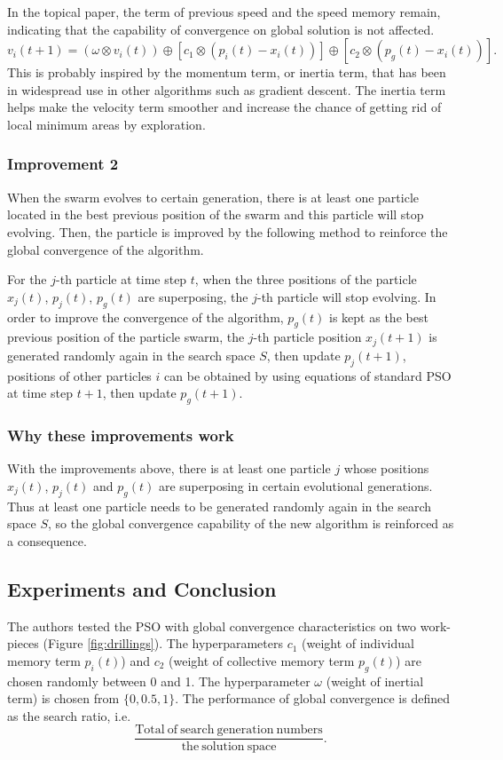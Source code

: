 \documentclass{IEEEtran}
\begin{document}
{{{            In the topical paper, the term of previous speed and the speed memory remain, indicating that the capability of convergence on global solution is not affected.
            $$v_i(t+1) = (\omega \otimes v_i(t)) \oplus [c_1 \otimes (p_i(t) - x_i(t))] \oplus [c_2 \otimes (p_g(t) - x_i(t))].$$
            This is probably inspired by the momentum term, or inertia term, that has been in widespread use in other algorithms such as gradient descent.
            The inertia term helps make the velocity term smoother and increase the chance of getting rid of local minimum areas by exploration.
        }

        \subsubsection{Improvement 2}
        {
            When the swarm evolves to certain generation, 
            there is at least one particle located in the best previous position of the swarm and this particle will stop evolving. 
            Then, the particle is improved by the following method to reinforce the global convergence of the algorithm.

            For the $j$-th particle at time step $t$, when the three positions of the particle $x_j(t)$, $p_j(t)$, $p_g(t)$ are superposing, the $j$-th particle will stop evolving. 
            In order to improve the convergence of the algorithm, $p_g(t)$ is kept as the best previous position of the particle swarm, 
            the $j$-th particle position $x_j(t+1)$ is generated randomly again in the search space $S$, then update $p_j(t+1)$, 
            positions of other particles $i$ can be obtained by using equations of standard PSO at time step $t+1$, then update $p_g(t+1)$.
        }

        \subsubsection{Why these improvements work}
        {
            With the improvements above, there is at least one particle $j$ whose positions $x_j(t)$, $p_j(t)$ and $p_g(t)$ are superposing in certain evolutional generations. 
            Thus at least one particle needs to be generated randomly again in the search space $S$, so the global convergence capability of the new algorithm is reinforced as a consequence.
        }
    }

    \subsection{Experiments and Conclusion}
    {
        The authors tested the PSO with global convergence characteristics on two work-pieces (Figure \ref{fig:drillings}).
        The hyperparameters $c_1$ (weight of individual memory term $p_i(t)$) and $c_2$ (weight of collective memory term $p_g(t)$) are chosen randomly between 0 and 1.
        The hyperparameter $\omega$ (weight of inertial term) is chosen from $\{ 0, 0.5, 1 \}$.
        The performance of global convergence is defined as the search ratio, i.e.
        $$\frac{\mathrm{Total~of~search~generation~numbers}}{\mathrm{the~solution~space}}.$$

}}
\end{document}
